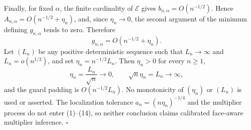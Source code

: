 Finally, for fixed \(\alpha\), the finite cardinality of \(\mathcal E\) gives \(b_{n,\alpha}=O(n^{-1/2})\).  Hence \(A_{n,\alpha}=O(n^{-1/2}+\eta_n)\), and, since \(\eta_n\to0\), the second argument of the minimum defining \(g_{n,\alpha}\) tends to zero.  Therefore
\[
g_{n,\alpha}=O(n^{-1/2}+\eta_n).
\]
Let \((L_n)\) be any positive deterministic sequence such that \(L_n\to\infty\) and \(L_n=o(n^{1/2})\), and set \(\eta_n=n^{-1/2}L_n\).  Then \(\eta_n>0\) for every \(n\ge1\),
\[
\eta_n=\frac{L_n}{\sqrt n}\longrightarrow0,
\qquad
\sqrt n\eta_n=L_n\longrightarrow\infty,
\]
and the guard padding is \(O(n^{-1/2}L_n)\).  No monotonicity of \((\eta_n)\) or \((L_n)\) is used or asserted.  The localization tolerance \(a_n=(n\eta_n)^{-1/4}\) and the multiplier process do not enter (1)--(14), so neither conclusion claims calibrated face-aware multiplier inference. \(\square\)